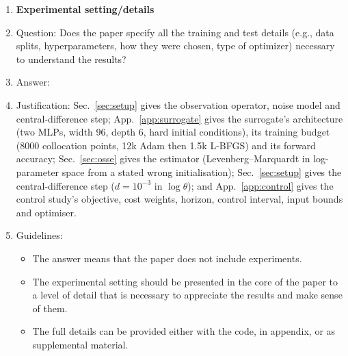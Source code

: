 \begin{enumerate}
\begin{itemize}
        \item The authors should provide scripts to reproduce all experimental results for the new proposed method and baselines. If only a subset of experiments are reproducible, they should state which ones are omitted from the script and why.
        \item At submission time, to preserve anonymity, the authors should release anonymized versions (if applicable).
        \item Providing as much information as possible in supplemental material (appended to the paper) is recommended, but including URLs to data and code is permitted.
    \end{itemize}


\item {\bf Experimental setting/details}
    \item[] Question: Does the paper specify all the training and test details (e.g., data splits, hyperparameters, how they were chosen, type of optimizer) necessary to understand the results?
    \item[] Answer: \answerYes{} %
    \item[] Justification: Sec.~\ref{sec:setup} gives the observation operator, noise model and central-difference step; App.~\ref{app:surrogate} gives the surrogate's architecture (two MLPs, width 96, depth 6, hard initial conditions), its training budget (8000 collocation points, 12k Adam then 1.5k L-BFGS) and its forward accuracy; Sec.~\ref{sec:osse} gives the estimator (Levenberg--Marquardt in log-parameter space from a stated wrong initialisation); Sec.~\ref{sec:setup} gives the central-difference step ($d{=}10^{-3}$ in $\log\theta$); and App.~\ref{app:control} gives the control study's objective, cost weights, horizon, control interval, input bounds and optimiser.
    \item[] Guidelines:
    \begin{itemize}
        \item The answer \answerNA{} means that the paper does not include experiments.
        \item The experimental setting should be presented in the core of the paper to a level of detail that is necessary to appreciate the results and make sense of them.
        \item The full details can be provided either with the code, in appendix, or as supplemental material.
    \end{itemize}


\end{enumerate}
